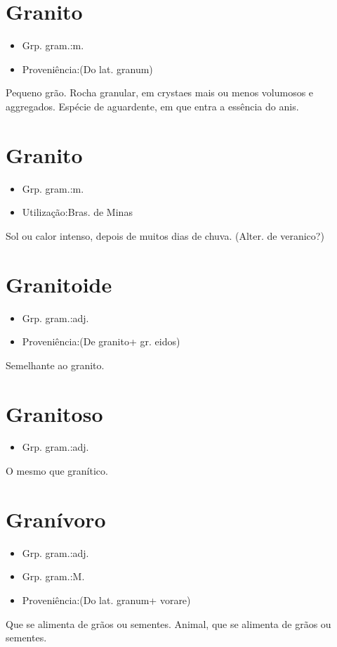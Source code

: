 \section{Granito}
\begin{itemize}
\item {Grp. gram.:m.}
\end{itemize}
\begin{itemize}
\item {Proveniência:(Do lat. \textunderscore granum\textunderscore )}
\end{itemize}
Pequeno grão.
Rocha granular, em crystaes mais ou menos volumosos e aggregados.
Espécie de aguardente, em que entra a essência do anis.
\section{Granito}
\begin{itemize}
\item {Grp. gram.:m.}
\end{itemize}
\begin{itemize}
\item {Utilização:Bras. de Minas}
\end{itemize}
Sol ou calor intenso, depois de muitos dias de chuva.
(Alter. de \textunderscore veranico\textunderscore ?)
\section{Granitoide}
\begin{itemize}
\item {Grp. gram.:adj.}
\end{itemize}
\begin{itemize}
\item {Proveniência:(De \textunderscore granito\textunderscore  + gr. \textunderscore eidos\textunderscore )}
\end{itemize}
Semelhante ao granito.
\section{Granitoso}
\begin{itemize}
\item {Grp. gram.:adj.}
\end{itemize}
O mesmo que \textunderscore granítico\textunderscore .
\section{Granívoro}
\begin{itemize}
\item {Grp. gram.:adj.}
\end{itemize}
\begin{itemize}
\item {Grp. gram.:M.}
\end{itemize}
\begin{itemize}
\item {Proveniência:(Do lat. \textunderscore granum\textunderscore  + \textunderscore vorare\textunderscore )}
\end{itemize}
Que se alimenta de grãos ou sementes.
Animal, que se alimenta de grãos ou sementes.
